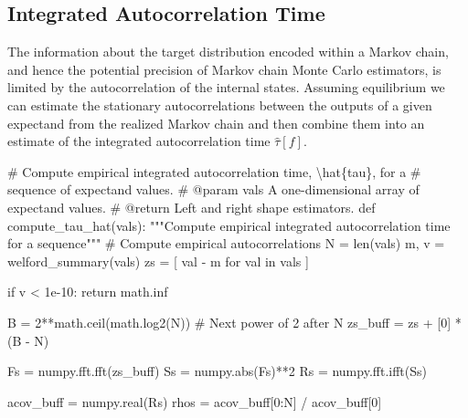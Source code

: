 \documentclass[
  letterpaper,
  DIV=11,
  numbers=noendperiod]{scrartcl}
\newenvironment{Shaded}{\begin{snugshade}}{\end{snugshade}}
\newcommand{\BuiltInTok}[1]{\textcolor[rgb]{0.00,0.23,0.31}{#1}}
\newcommand{\CommentTok}[1]{\textcolor[rgb]{0.37,0.37,0.37}{#1}}
\newcommand{\ControlFlowTok}[1]{\textcolor[rgb]{0.00,0.23,0.31}{#1}}
\newcommand{\DecValTok}[1]{\textcolor[rgb]{0.68,0.00,0.00}{#1}}
\newcommand{\FloatTok}[1]{\textcolor[rgb]{0.68,0.00,0.00}{#1}}
\newcommand{\KeywordTok}[1]{\textcolor[rgb]{0.00,0.23,0.31}{#1}}
\newcommand{\NormalTok}[1]{\textcolor[rgb]{0.00,0.23,0.31}{#1}}
\newcommand{\OperatorTok}[1]{\textcolor[rgb]{0.37,0.37,0.37}{#1}}
\begin{document}
\subsection{Integrated Autocorrelation
Time}\label{integrated-autocorrelation-time}

The information about the target distribution encoded within a Markov
chain, and hence the potential precision of Markov chain Monte Carlo
estimators, is limited by the autocorrelation of the internal states.
Assuming equilibrium we can estimate the stationary autocorrelations
between the outputs of a given expectand from the realized Markov chain
and then combine them into an estimate of the integrated autocorrelation
time \(\hat{\tau}[f]\).

\begin{Shaded}
\begin{Highlighting}[]
\CommentTok{\# Compute empirical integrated autocorrelation time, \textbackslash{}hat\{tau\}, for a}
\CommentTok{\# sequence of expectand values.}
\CommentTok{\# @param vals A one{-}dimensional array of expectand values.}
\CommentTok{\# @return Left and right shape estimators.}
\KeywordTok{def}\NormalTok{ compute\_tau\_hat(vals):}
  \CommentTok{"""Compute empirical integrated autocorrelation time for a sequence"""}
  \CommentTok{\# Compute empirical autocorrelations}
\NormalTok{  N }\OperatorTok{=} \BuiltInTok{len}\NormalTok{(vals)}
\NormalTok{  m, v }\OperatorTok{=}\NormalTok{ welford\_summary(vals)}
\NormalTok{  zs }\OperatorTok{=}\NormalTok{ [ val }\OperatorTok{{-}}\NormalTok{ m }\ControlFlowTok{for}\NormalTok{ val }\KeywordTok{in}\NormalTok{ vals ]}

  \ControlFlowTok{if}\NormalTok{ v }\OperatorTok{\textless{}} \FloatTok{1e{-}10}\NormalTok{:}
    \ControlFlowTok{return}\NormalTok{ math.inf}

\NormalTok{  B }\OperatorTok{=} \DecValTok{2}\OperatorTok{**}\NormalTok{math.ceil(math.log2(N)) }\CommentTok{\# Next power of 2 after N}
\NormalTok{  zs\_buff }\OperatorTok{=}\NormalTok{ zs }\OperatorTok{+}\NormalTok{ [}\DecValTok{0}\NormalTok{] }\OperatorTok{*}\NormalTok{ (B }\OperatorTok{{-}}\NormalTok{ N)}

\NormalTok{  Fs }\OperatorTok{=}\NormalTok{ numpy.fft.fft(zs\_buff)}
\NormalTok{  Ss }\OperatorTok{=}\NormalTok{ numpy.}\BuiltInTok{abs}\NormalTok{(Fs)}\OperatorTok{**}\DecValTok{2}
\NormalTok{  Rs }\OperatorTok{=}\NormalTok{ numpy.fft.ifft(Ss)}

\NormalTok{  acov\_buff }\OperatorTok{=}\NormalTok{ numpy.real(Rs)}
\NormalTok{  rhos }\OperatorTok{=}\NormalTok{ acov\_buff[}\DecValTok{0}\NormalTok{:N] }\OperatorTok{/}\NormalTok{ acov\_buff[}\DecValTok{0}\NormalTok{]}


\end{Highlighting}
\end{Shaded}
\end{document}
